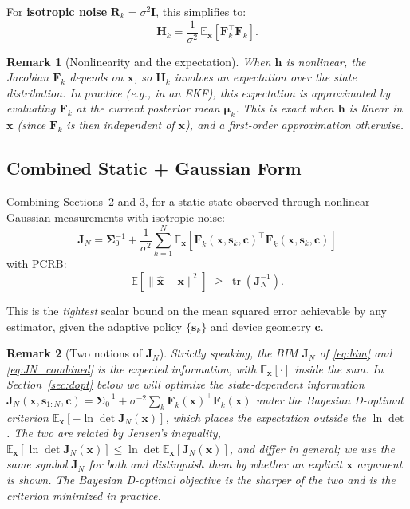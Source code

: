 \documentclass[11pt,a4paper]{article}
\newcommand{\E}{\mathbb{E}}
\newcommand{\tr}{\operatorname{tr}}
\newtheorem{remark}{Remark}
\begin{document}
For \textbf{isotropic noise} $\bm{R}_k = \sigma^2 \bm{I}$, this simplifies to:
\begin{equation}
  \bm{H}_k = \frac{1}{\sigma^2}\,\E_{\bm{x}}\!\left[\bm{F}_k^\top \bm{F}_k\right].
  \label{eq:H_iso}
\end{equation}

\begin{remark}[Nonlinearity and the expectation]
When $\bm{h}$ is nonlinear, the Jacobian $\bm{F}_k$ depends on $\bm{x}$, so $\bm{H}_k$ involves an expectation over the state distribution.  In practice (e.g., in an EKF), this expectation is approximated by evaluating $\bm{F}_k$ at the current posterior mean $\bm{\mu}_k$.  This is exact when $\bm{h}$ is linear in $\bm{x}$ (since $\bm{F}_k$ is then independent of $\bm{x}$), and a first-order approximation otherwise.
\end{remark}

\subsection{Combined Static + Gaussian Form}

Combining Sections~2 and 3, for a static state observed through nonlinear Gaussian measurements with isotropic noise:
\begin{equation}
  \boxed{\bm{J}_N = \bm{\Sigma}_0^{-1} + \frac{1}{\sigma^2}\sum_{k=1}^{N} \E_{\bm{x}}\!\left[\bm{F}_k(\bm{x}, \bm{s}_k, \bm{c})^\top \bm{F}_k(\bm{x}, \bm{s}_k, \bm{c})\right]}
  \label{eq:JN_combined}
\end{equation}
with PCRB:
\begin{equation}
  \E\!\left[\|\hat{\bm{x}} - \bm{x}\|^2\right] \;\geq\; \tr\!\left(\bm{J}_N^{-1}\right).
  \label{eq:mse_bound}
\end{equation}

This is the \emph{tightest} scalar bound on the mean squared error achievable by any estimator, given the adaptive policy $\{\bm{s}_k\}$ and device geometry $\bm{c}$.

\begin{remark}[Two notions of $\bm{J}_N$]
\label{rem:two_JN}
Strictly speaking, the BIM $\bm{J}_N$ of \eqref{eq:bim} and \eqref{eq:JN_combined} is the \emph{expected} information, with $\mathbb{E}_{\bm{x}}[\cdot]$ \emph{inside} the sum.  In Section~\ref{sec:dopt} below we will optimize the \emph{state-dependent} information $\bm{J}_N(\bm{x}, \bm{s}_{1:N}, \bm{c}) = \bm{\Sigma}_0^{-1} + \sigma^{-2}\sum_k \bm{F}_k(\bm{x})^\top \bm{F}_k(\bm{x})$ under the Bayesian D-optimal criterion $\mathbb{E}_{\bm{x}}[-\ln\det\bm{J}_N(\bm{x})]$, which places the expectation \emph{outside} the $\ln\det$.  The two are related by Jensen's inequality, $\mathbb{E}_{\bm{x}}[\ln\det\bm{J}_N(\bm{x})] \le \ln\det\mathbb{E}_{\bm{x}}[\bm{J}_N(\bm{x})]$, and differ in general; we use the same symbol $\bm{J}_N$ for both and distinguish them by whether an explicit $\bm{x}$ argument is shown.  The Bayesian D-optimal objective is the sharper of the two and is the criterion minimized in practice.
\end{remark}
\end{document}
